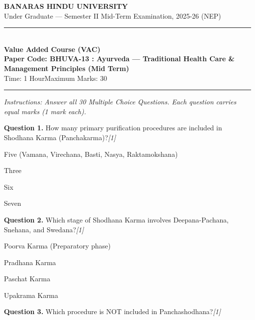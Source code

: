 \documentclass[11pt,a4paper]{article}
\newcommand{\pts}[1]{\hfill   \textit{[#1]}}
\begin{document}
\begin{center}
  {\large\bfseries BANARAS HINDU UNIVERSITY}\\[2pt]
  {\normalsize Under Graduate --- Semester II Mid-Term Examination, 2025-26 (NEP)}\\[6pt]
  \rule{0.8\linewidth}{0.5pt}\\[6pt]
  {\large\bfseries Value Added Course (VAC)}\\[4pt]
  {\large\bfseries Paper Code: BHUVA-13 : Ayurveda --- Traditional Health Care \& Management Principles (Mid Term)}\\[4pt]
  {\normalsize Time: 1 Hour\hfill Maximum Marks: 30}
\end{center}

\rule{\linewidth}{0.4pt}

\smallskip



\noindent   \textit{Instructions: Answer all 30 Multiple Choice Questions. Each question carries equal marks (1 mark each).}

\bigskip




\noindent   \textbf{Question 1.} How many primary purification procedures are included in Shodhana Karma (Panchakarma)?\pts{1}

\begin{parts}
  \item Five (Vamana, Virechana, Basti, Nasya, Raktamokshana)
  \item Three
  \item Six
  \item Seven
\end{parts}

\medskip




\noindent   \textbf{Question 2.} Which stage of Shodhana Karma involves Deepana-Pachana, Snehana, and Swedana?\pts{1}

\begin{parts}
  \item Poorva Karma (Preparatory phase)
  \item Pradhana Karma
  \item Paschat Karma
  \item Upakrama Karma
\end{parts}

\medskip




\noindent   \textbf{Question 3.} Which procedure is NOT included in Panchashodhana?\pts{1}
\end{document}
